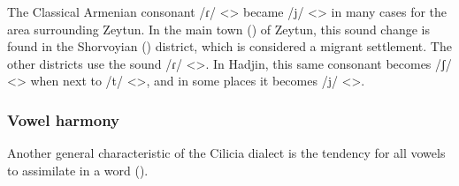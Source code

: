 The Classical Armenian consonant /ɾ/ <> became /j/ <> in many cases for the area surrounding Zeytun. In the main town () of Zeytun, this sound change is found in the Shorvoyian () district, which is considered a migrant settlement. The other districts use the sound /ɾ/ <>. In Hadjin, this same consonant becomes /ʃ/ <> when next to /t/ <>, and in some places it becomes /j/ <>. 

\subsubsection{Vowel harmony}\label{section:cilicia:phono:soundchange:vowelharmony}

Another general characteristic of the Cilicia dialect is the tendency for all vowels to assimilate in a word (). 








